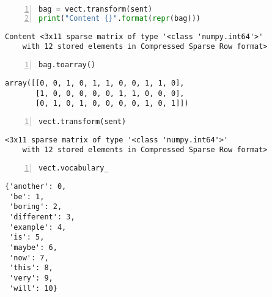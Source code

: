 \documentclass[10pt,parskip=half,
	toc=sectionentrywithdots,
	bibliography=totocnumbered,
	captions=tableheading,numbers=noendperiod]{scrartcl}
\begin{document}
\begin{lstlisting}[language=Python,numbers=left,xleftmargin=20pt,xrightmargin=5pt,belowskip=5pt,aboveskip=5pt]
bag = vect.transform(sent)
print("Content {}".format(repr(bag)))
\end{lstlisting}

\begin{lstlisting}[language={},postbreak={},numbers=none,xrightmargin=7pt,belowskip=5pt,aboveskip=5pt,breakindent=0pt]
Content <3x11 sparse matrix of type '<class 'numpy.int64'>'
	with 12 stored elements in Compressed Sparse Row format>

\end{lstlisting}

\begin{lstlisting}[language=Python,numbers=left,xleftmargin=20pt,xrightmargin=5pt,belowskip=5pt,aboveskip=5pt]
bag.toarray()
\end{lstlisting}

\begin{lstlisting}[language={},postbreak={},numbers=none,xrightmargin=7pt,breakindent=0pt,aboveskip=5pt,belowskip=5pt]
array([[0, 0, 1, 0, 1, 1, 0, 0, 1, 1, 0],
       [1, 0, 0, 0, 0, 0, 1, 1, 0, 0, 0],
       [0, 1, 0, 1, 0, 0, 0, 0, 1, 0, 1]])
\end{lstlisting}

\begin{lstlisting}[language=Python,numbers=left,xleftmargin=20pt,xrightmargin=5pt,belowskip=5pt,aboveskip=5pt]
vect.transform(sent)
\end{lstlisting}

\begin{lstlisting}[language={},postbreak={},numbers=none,xrightmargin=7pt,breakindent=0pt,aboveskip=5pt,belowskip=5pt]
<3x11 sparse matrix of type '<class 'numpy.int64'>'
	with 12 stored elements in Compressed Sparse Row format>
\end{lstlisting}

\begin{lstlisting}[language=Python,numbers=left,xleftmargin=20pt,xrightmargin=5pt,belowskip=5pt,aboveskip=5pt]
vect.vocabulary_
\end{lstlisting}

\begin{lstlisting}[language={},postbreak={},numbers=none,xrightmargin=7pt,breakindent=0pt,aboveskip=5pt,belowskip=5pt]
{'another': 0,
 'be': 1,
 'boring': 2,
 'different': 3,
 'example': 4,
 'is': 5,
 'maybe': 6,
 'now': 7,
 'this': 8,
 'very': 9,
 'will': 10}
\end{lstlisting}
\end{document}
